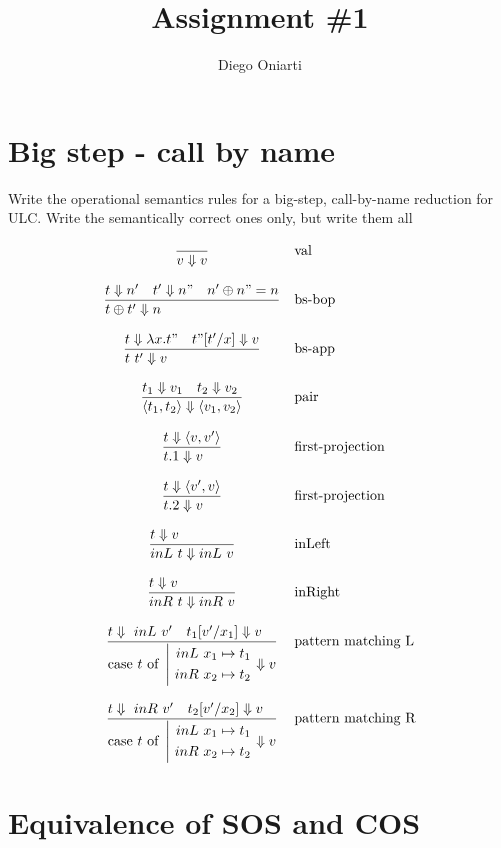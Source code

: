 \documentclass{article}
\title{Assignment \#1}
\author{Diego Oniarti}
\newcommand{\bop}[0]{\ensuremath\oplus}
\newcommand{\st}[3][]{\ensuremath{\displaystyle\frac{#3\hfill}{#2\hfill} \text{#1}}}
\newcommand{\lam}[2]{\ensuremath{\lambda#1.#2}}
\newcommand{\inl}[0]{\ensuremath{\ inL\ }}
\newcommand{\inr}[0]{\ensuremath{\ inR\ }}
\newcommand{\case}[3]{\ensuremath{\text{case}\ #1\ \text{of}\ \left|\begin{aligned}#2\\#3\end{aligned}\right.}}
\newcommand{\Da}[0]{\ensuremath{\Downarrow}}
\begin{document}
\maketitle

\section{Big step - call by name}
Write the operational semantics rules for a big-step, call-by-name reduction for ULC. Write the semantically correct ones only, but write them all

\[\begin{array}{cl}
    \st{v\Downarrow v}{} & \text{val}\\
    \\
    \st{t \bop t' \Downarrow n}{t\Downarrow n' \quad t'\Downarrow n" \quad n'\bop n" = n} & \text{bs-bop} \\
    \\
    \st{t\ t'\Downarrow v}{t\Downarrow \lam{x}{t"} \quad t"[t'/x]\Downarrow v}  & \text{bs-app} \\
    \\
    \st{\langle t_1, t_2 \rangle \Downarrow \langle v_1,v_2 \rangle}{t_1\Downarrow v_1\quad t_2\Downarrow v_2} & \text{pair} \\
    \\
    \st{t.1\Downarrow v}{t\Downarrow \langle v,v' \rangle} & \text{first-projection} \\
    \\
    \st{t.2\Downarrow v}{t\Downarrow \langle v',v \rangle} & \text{first-projection} \\
    \\
    \st{inL\ t\Downarrow inL\ v}{t\Downarrow v} & \text{inLeft} \\
    \\
    \st{inR\ t\Downarrow inR\ v}{t\Downarrow v} & \text{inRight} \\
    \\
    \st{\case{t}{\inl x_1\mapsto t_1}{\inr x_2\mapsto t_2}\Downarrow v}{t\Da \inl v' \quad t_1[v'/x_1]\Da v} & \text{pattern matching L}
    \\ \\
    \st{\case{t}{\inl x_1\mapsto t_1}{\inr x_2\mapsto t_2}\Downarrow v}{t\Da \inr v' \quad t_2[v'/x_2]\Da v} & \text{pattern matching R}
\end{array}\] 

\section{Equivalence of SOS and COS}
\end{document}
